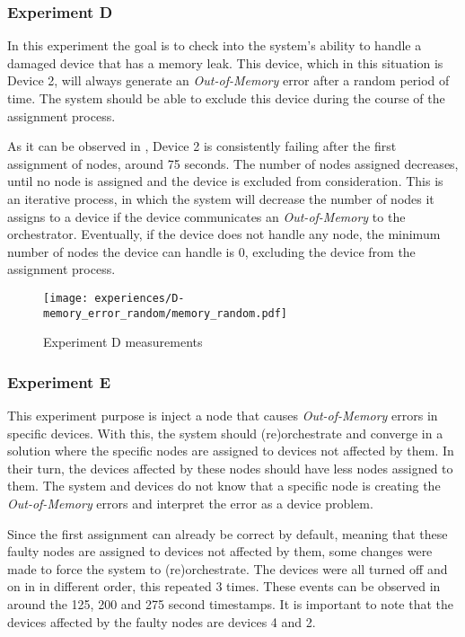 
\subsubsection{Experiment D}

In this experiment the goal is to check into the system's ability to handle a damaged device that has a memory leak. This device, which in this situation is Device 2, will always generate an \textit{Out-of-Memory} error after a random period of time. The system should be able to exclude this device during the course of the assignment process.

As it can be observed in , Device 2 is consistently failing after the first assignment of nodes, around 75 seconds. The number of nodes assigned decreases, until no node is assigned and the device is excluded from consideration. This is an iterative process, in which the system will decrease the number of nodes it assigns to a device if the device communicates an \textit{Out-of-Memory} to the orchestrator. Eventually, if the device does not handle any node, the minimum number of nodes the device can handle is 0, excluding the device from the assignment process.

\begin{figure}[h]
\centering
\texttt{[image: experiences/D-memory\_error\_random/memory\_random.pdf]}
\caption[Experiment D measurements]{Experiment D measurements}\label{fig:experiment_d_graph}
\end{figure}


\subsubsection{Experiment E}

This experiment purpose is inject a node that causes \textit{Out-of-Memory} errors in specific devices. With this, the system should (re)orchestrate and converge in a solution where the specific nodes are assigned to devices not affected by them. In their turn, the devices affected by these nodes should have less nodes assigned to them. The system and devices do not know that a specific node is creating the \textit{Out-of-Memory} errors and interpret the error as a device problem.

Since the first assignment can already be correct by default, meaning that these faulty nodes are assigned to devices not affected by them, some changes were made to force the system to (re)orchestrate. The devices were all turned off and on in in different order, this repeated 3 times. These events can be observed in  around the 125, 200 and 275 second timestamps. It is important to note that the devices affected by the faulty nodes are devices 4 and 2.

